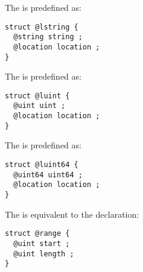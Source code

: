 
The  is predefined as:
\begin{lstlisting}[language=galgas]
struct @lstring {
  @string string ;
  @location location ;
}
\end{lstlisting}








The  is predefined as:
\begin{lstlisting}[language=galgas]
struct @luint {
  @uint uint ;
  @location location ;
}
\end{lstlisting}






The  is predefined as:
\begin{lstlisting}[language=galgas]
struct @luint64 {
  @uint64 uint64 ;
  @location location ;
}
\end{lstlisting}



The  is equivalent to the declaration:
\begin{lstlisting}[language=galgas]
struct @range {
  @uint start ;
  @uint length ;
}
\end{lstlisting}


